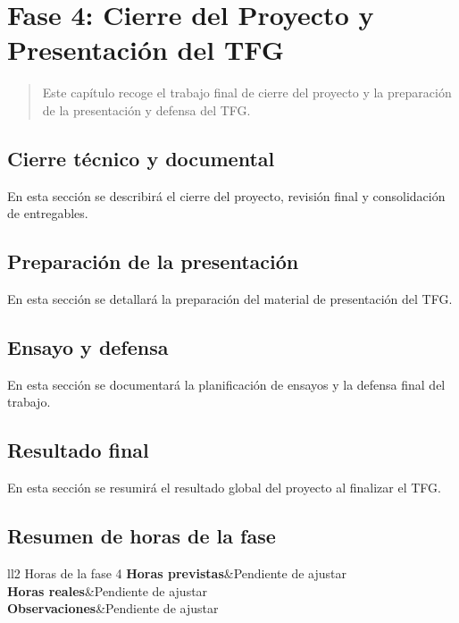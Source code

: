 \chapter{Fase 4: Cierre del Proyecto y Presentación del TFG}

\begin{abstract}
Este capítulo recoge el trabajo final de cierre del proyecto y la preparación de la
presentación y defensa del TFG.
\end{abstract}

\section{Cierre técnico y documental}
En esta sección se describirá el cierre del proyecto, revisión final y consolidación de entregables.

\section{Preparación de la presentación}
En esta sección se detallará la preparación del material de presentación del TFG.

\section{Ensayo y defensa}
En esta sección se documentará la planificación de ensayos y la defensa final del trabajo.

\section{Resultado final}
En esta sección se resumirá el resultado global del proyecto al finalizar el TFG.

\section{Resumen de horas de la fase}

\begin{table}[htb]
	\centering
	\begin{coolTable}{ll}{2}
{Horas de la fase 4}
	\textbf{Horas previstas}&Pendiente de ajustar\\
	\textbf{Horas reales}&Pendiente de ajustar\\
	\textbf{Observaciones}&Pendiente de ajustar\\
	\end{coolTable}
	\caption{Resumen de horas de la Fase 4}
\end{table}
